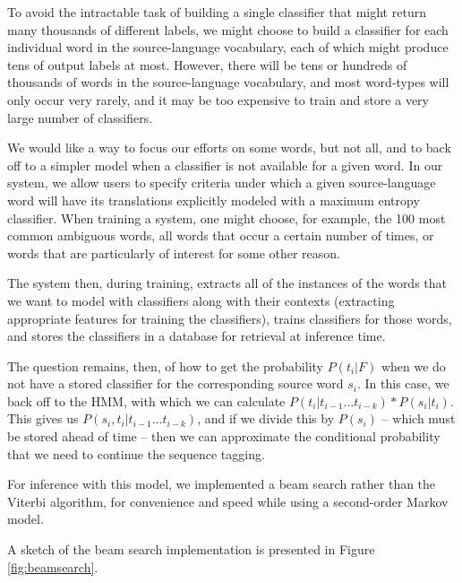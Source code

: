 \documentclass[11pt]{article}
\begin{document}
To avoid the intractable task of building a single classifier that might return
many thousands of different labels, we might choose to build a classifier for
each individual word in the source-language vocabulary, each of which might
produce tens of output labels at most. However, there will be tens or hundreds
of thousands of words in the source-language vocabulary, and most word-types
will only occur very rarely, and it may be too expensive to train and store a
very large number of classifiers.

We would like a way to focus our efforts on some words, but not all, and to
back off to a simpler model when a classifier is not available for a given
word. In our system, we allow users to specify criteria under which a given
source-language word will have its translations explicitly modeled with a
maximum entropy classifier. When training a system, one might choose, for
example, the 100 most common ambiguous words, all words that occur a certain
number of times, or words that are particularly of interest for some other
reason.

The system then, during training, extracts all of the instances of the words
that we want to model with classifiers along with their contexts (extracting
appropriate features for training the classifiers), trains classifiers for
those words, and stores the classifiers in a database for retrieval at
inference time.

The question remains, then, of how to get the probability $P(t_i | F)$ when we
do not have a stored classifier for the corresponding source word $s_i$. In
this case, we back off to the HMM, with which we can calculate $P(t_i |
t_{i-1}...t_{i-k}) * P(s_i | t_i)$. This gives us $P(s_i, t_i |
t_{i-1}...t_{i-k})$, and if we divide this by $P(s_i)$ -- which must be stored
ahead of time -- then we can approximate the conditional probability that we
need to continue the sequence tagging.

For inference with this model, we implemented a beam search rather than the
Viterbi algorithm, for convenience and speed while using a second-order Markov
model.

A sketch of the beam search implementation is presented in Figure
\ref{fig:beamsearch}.
\end{document}
